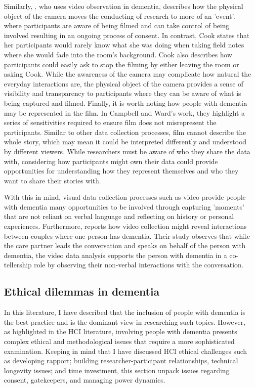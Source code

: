 Similarly, \cite{cook2002using}, who uses video observation in dementia, describes how the physical object of the camera moves the conducting of research to more of an 'event', where participants are aware of being filmed and can take control of being involved resulting in an ongoing process of consent. In contrast, Cook states that her participants would rarely know what she was doing when taking field notes where she would fade into the room's background. Cook also describes how participants could easily ask to stop the filming by either leaving the room or asking Cook. While the awareness of the camera may complicate how natural the everyday interactions are, the physical object of the camera provides a sense of visibility and transparency to participants where they can be aware of what is being captured and filmed. Finally, it is worth noting how people with dementia may be represented in the film. In Campbell and Ward's work, they highlight a series of sensitivities required to ensure film does not misrepresent the participants. Similar to other data collection processes, film cannot describe the whole story, which may mean it could be interpreted differently and understood by different viewers. While researchers must be aware of who they share the data with, considering how participants might own their data could provide opportunities for understanding how they represent themselves and who they want to share their stories with.

With this in mind, visual data collection processes such as video provide people with dementia many opportunities to be involved through capturing 'moments' that are not reliant on verbal language and reflecting on history or personal experiences. Furthermore, \cite{majlesi2017video} reports how video collection might reveal interactions between couples where one person has dementia. Their study observes that while the care partner leads the conversation and speaks on behalf of the person with dementia, the video data analysis supports the person with dementia in a co-tellership role by observing their non-verbal interactions with the conversation.


\subsection{Ethical dilemmas in dementia}
\label{BL:EthicalDilemmas}
In this literature, I have described that the inclusion of people with dementia is the best practice and is the dominant view in researching such topics. However, as highlighted in the HCI literature, involving people with dementia presents complex ethical and methodological issues that require a more sophisticated examination. Keeping in mind that I have discussed HCI ethical challenges such as developing rapport; building researcher-participant relationships, technical longevity issues; and time investment, this section unpack issues regarding consent, gatekeepers, and managing power dynamics.

